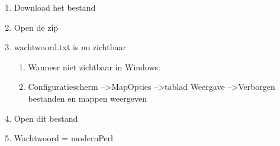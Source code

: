 \begin{enumerate}
  \item Download het bestand
  \item Open de zip
  \item wachtwoord.txt is nu zichtbaar
\begin{enumerate}
	\item Wanneer niet zichtbaar in Windows:
	\item Configuratiescherm --\textgreater MapOpties --\textgreater tablad Weergave --\textgreater Verborgen bestanden en mappen weergeven
\end{enumerate}
  \item Open dit bestand
  \item Wachtwoord = modernPerl
\end{enumerate}